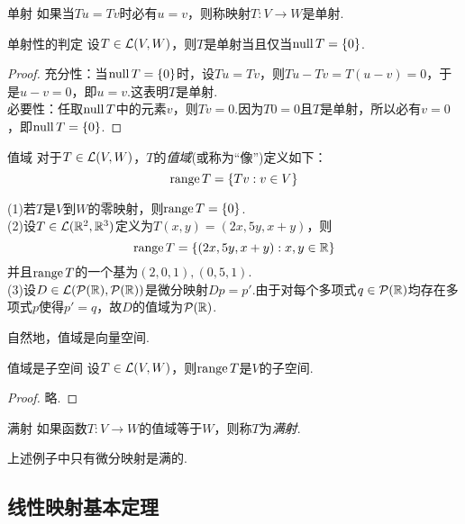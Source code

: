 \begin{definition}{单射}
	如果当$Tu=Tv$时必有$u=v$，则称映射$T:V \to W$是单射.
\end{definition}

\begin{proposition}{单射性的判定}
	设$T \in \mathcal{L} (V,W)$，则$T$是单射当且仅当$\operatorname{null} T=\{ 0 \}$.
\end{proposition}
\begin{proof}
	 充分性：当$\operatorname{null} T = \{ 0 \}$时，设$Tu=Tv$，则$Tu-Tv=T(u-v)=0$，于是$u-v=0$，即$u=v$.这表明$T$是单射. \\
	 必要性：任取$\operatorname{null} T$中的元素$v$，则$Tv=0$.因为$T0=0$且$T$是单射，所以必有$v=0$，即$\operatorname{null} T = \{ 0 \}$.
\end{proof}

\begin{definition}{值域}
	对于$T \in \mathcal{L} (V,W)$，$T$的\textit{值域}(或称为“像”)定义如下：$$\operatorname{range} T = \{ Tv : v \in V \}$$
\end{definition}

\begin{example}{}
	(1)若$T$是$V$到$W$的零映射，则$\operatorname{range} T=\{ 0 \}$. \\
	(2)设$T \in \mathcal{L} (\mathbb{R} ^2,\mathbb{R} ^3)$定义为$T(x,y)=(2x,5y,x+y)$，则$$\operatorname{range} T = \{ (2x,5y,x+y):x,y \in \mathbb{R} \}$$
	并且$\operatorname{range} T$的一个基为$(2,0,1),(0,5,1)$. \\
	(3)设$D \in \mathcal{L} (\mathcal{P}(\mathbb{R} ),\mathcal{P}(\mathbb{R} ))$是微分映射$Dp=p'$.由于对每个多项式$q \in \mathcal{P}(\mathbb{R} )$均存在多项式$p$使得$p'=q$，故$D$的值域为$\mathcal{P}(\mathbb{R} )$.
\end{example}

自然地，值域是向量空间.

\begin{proposition}{值域是子空间}
	设$T \in \mathcal{L} (V,W)$，则$\operatorname{range} T$是$V$的子空间.
\end{proposition}
\begin{proof}
	略.
\end{proof}

\begin{definition}{满射}
	如果函数$T:V \to W$的值域等于$W$，则称$T$为\textit{满射}.
\end{definition}

上述例子中只有微分映射是满的.

\subsection{线性映射基本定理}

